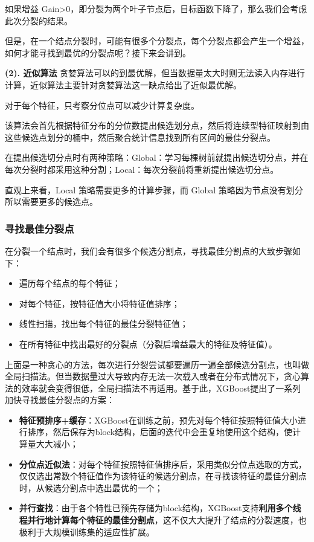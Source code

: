 \documentclass[12pt]{article}
\begin{document}
如果增益 Gain>0，即分裂为两个叶子节点后，目标函数下降了，那么我们会考虑此次分裂的结果。

但是，在一个结点分裂时，可能有很多个分裂点，每个分裂点都会产生一个增益，如何才能寻找到最优的分裂点呢？接下来会讲到。

\textbf{(2). 近似算法}
贪婪算法可以的到最优解，但当数据量太大时则无法读入内存进行计算，近似算法主要针对贪婪算法这一缺点给出了近似最优解。

对于每个特征，只考察分位点可以减少计算复杂度。

该算法会首先根据特征分布的分位数提出候选划分点，然后将连续型特征映射到由这些候选点划分的桶中，然后聚合统计信息找到所有区间的最佳分裂点。

在提出候选切分点时有两种策略：Global：学习每棵树前就提出候选切分点，并在每次分裂时都采用这种分割；Local：每次分裂前将重新提出候选切分点。

直观上来看，Local 策略需要更多的计算步骤，而 Global 策略因为节点没有划分所以需要更多的候选点。

\subsubsection{寻找最佳分裂点}
在分裂一个结点时，我们会有很多个候选分割点，寻找最佳分割点的大致步骤如下：
\begin{itemize}
\setlength{\itemsep}{0pt}
\setlength{\parsep}{0pt}
\setlength{\parskip}{0pt}
    \item 遍历每个结点的每个特征；
    \item 对每个特征，按特征值大小将特征值排序；
    \item 线性扫描，找出每个特征的最佳分裂特征值；
    \item 在所有特征中找出最好的分裂点（分裂后增益最大的特征及特征值）。
\end{itemize}

上面是一种贪心的方法，每次进行分裂尝试都要遍历一遍全部候选分割点，也叫做全局扫描法。但当数据量过大导致内存无法一次载入或者在分布式情况下，贪心算法的效率就会变得很低，全局扫描法不再适用。基于此，XGBoost提出了一系列加快寻找最佳分裂点的方案：

\begin{itemize}
\setlength{\itemsep}{0pt}
\setlength{\parsep}{0pt}
\setlength{\parskip}{0pt}
    \item \textbf{特征预排序+缓存}：XGBoost在训练之前，预先对每个特征按照特征值大小进行排序，然后保存为block结构，后面的迭代中会重复地使用这个结构，使计算量大大减小；
    \item \textbf{分位点近似法}：对每个特征按照特征值排序后，采用类似分位点选取的方式，仅仅选出常数个特征值作为该特征的候选分割点，在寻找该特征的最佳分割点时，从候选分割点中选出最优的一个；
    \item \textbf{并行查找}：由于各个特性已预先存储为block结构，XGBoost支持\textbf{利用多个线程并行地计算每个特征的最佳分割点}，这不仅大大提升了结点的分裂速度，也极利于大规模训练集的适应性扩展。
\end{itemize}
\end{document}
